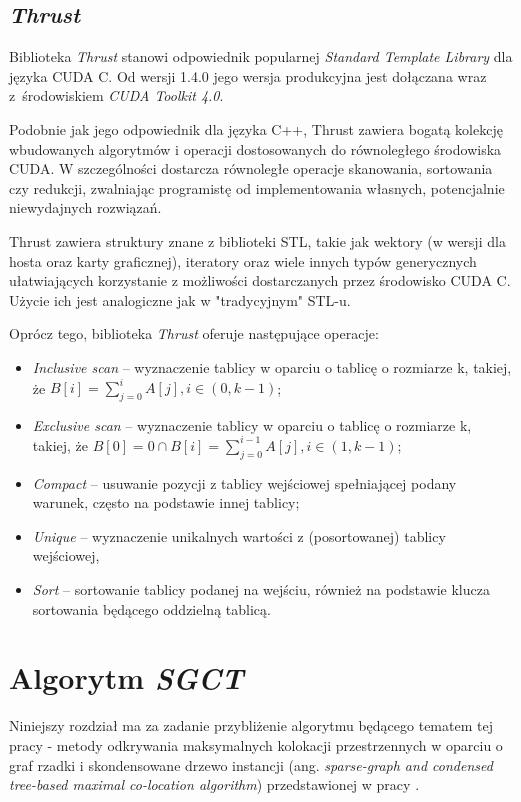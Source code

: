 \documentclass[12pt]{article}
\begin{document}
\subsection{\textit{Thrust}}

Biblioteka \textit{Thrust} stanowi odpowiednik popularnej \textit{Standard Template Library} dla języka CUDA C. Od wersji 1.4.0 jego wersja produkcyjna jest dołączana wraz z~środowiskiem \textit{CUDA Toolkit 4.0}.

Podobnie jak jego odpowiednik dla języka C++, Thrust zawiera bogatą kolekcję wbudowanych algorytmów i operacji dostosowanych do równoległego środowiska CUDA. W szczególności dostarcza równoległe operacje skanowania, sortowania czy redukcji, zwalniając programistę od implementowania własnych, potencjalnie niewydajnych rozwiązań.

Thrust zawiera struktury znane z biblioteki STL, takie jak wektory (w wersji dla hosta oraz karty graficznej), iteratory oraz wiele innych typów generycznych ułatwiających korzystanie z możliwości dostarczanych przez środowisko CUDA C. Użycie ich jest analogiczne jak w "tradycyjnym" STL-u.

Oprócz tego, biblioteka \textit{Thrust} oferuje następujące operacje:

\begin{itemize}
\item \textit{Inclusive scan} – wyznaczenie tablicy w oparciu o tablicę o rozmiarze k, takiej, że $ B[i] = \sum\limits_{j=0}^{i} A[j], i \in (0, k-1) $;
\item \textit{Exclusive scan} – wyznaczenie tablicy w oparciu o tablicę o rozmiarze k, takiej, że $ B[0] = 0 \cap B[i] = \sum\limits_{j=0}^{i-1} A[j], i \in (1,k-1) $;
\item \textit{Compact} – usuwanie pozycji z tablicy wejściowej spełniającej podany warunek, często na podstawie innej tablicy;
\item \textit{Unique} – wyznaczenie unikalnych wartości z (posortowanej) tablicy wejściowej,
\item \textit{Sort} – sortowanie tablicy podanej na wejściu, również na podstawie klucza sortowania będącego oddzielną tablicą.
\end{itemize}
\newpage

\section{Algorytm \textit{SGCT}}
\label{sec:china}

Niniejszy rozdział ma za zadanie przybliżenie algorytmu będącego tematem tej pracy - metody odkrywania maksymalnych kolokacji przestrzennych w oparciu o graf rzadki i skondensowane drzewo instancji (ang. \textit{sparse-graph and condensed tree-based maximal co-location algorithm}) przedstawionej w pracy \cite{chinczyki}. 
\end{document}
